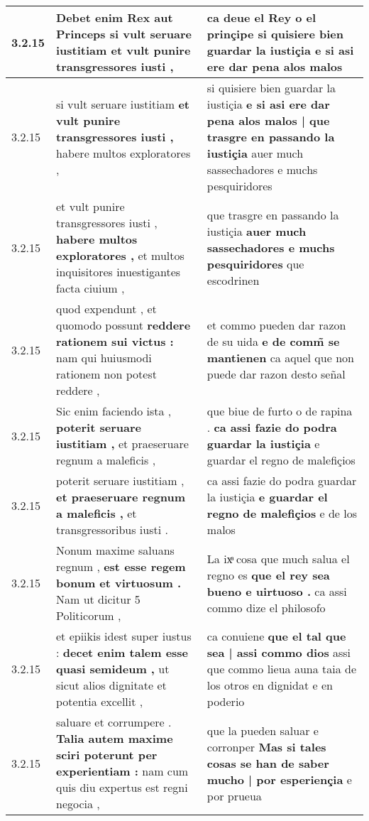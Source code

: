 \begin{tabular}{|p{1cm}|p{6.5cm}|p{6.5cm}|}
3.2.15 & Debet enim Rex aut Princeps \textbf{ si vult seruare iustitiam } et vult punire transgressores iusti , & ca deue el Rey o el prinçipe \textbf{ si quisiere bien guardar la iustiçia } e si asi ere dar pena alos malos \\\hline
3.2.15 & si vult seruare iustitiam \textbf{ et vult punire transgressores iusti , } habere multos exploratores , & si quisiere bien guardar la iustiçia \textbf{ e si asi ere dar pena alos malos | que trasgre en passando la iustiçia } auer much sassechadores e muchs pesquiridores \\\hline
3.2.15 & et vult punire transgressores iusti , \textbf{ habere multos exploratores , } et multos inquisitores inuestigantes facta ciuium , & que trasgre en passando la iustiçia \textbf{ auer much sassechadores e muchs pesquiridores } que escodrinen \\\hline
3.2.15 & quod expendunt , et quomodo possunt \textbf{ reddere rationem sui victus : } nam qui huiusmodi rationem non potest reddere , & et commo pueden dar razon de su uida \textbf{ e de comm̃ se mantienen } ca aquel que non puede dar razon desto señal \\\hline
3.2.15 & Sic enim faciendo ista , \textbf{ poterit seruare iustitiam , } et praeseruare regnum a maleficis , & que biue de furto o de rapina . \textbf{ ca assi fazie do podra guardar la iustiçia } e guardar el regno de malefiçios \\\hline
3.2.15 & poterit seruare iustitiam , \textbf{ et praeseruare regnum a maleficis , } et transgressoribus iusti . & ca assi fazie do podra guardar la iustiçia \textbf{ e guardar el regno de malefiçios } e de los malos \\\hline
3.2.15 & Nonum maxime saluans regnum , \textbf{ est esse regem bonum et virtuosum . } Nam ut dicitur 5 Politicorum , & La ixͣ cosa que much salua el regno es \textbf{ que el rey sea bueno e uirtuoso . } ca assi commo dize el philosofo \\\hline
3.2.15 & et epiikis idest super iustus : \textbf{ decet enim talem esse quasi semideum , } ut sicut alios dignitate et potentia excellit , & ca conuiene \textbf{ que el tal que sea | assi commo dios } assi que commo lieua auna taia de los otros en dignidat e en poderio \\\hline
3.2.15 & saluare et corrumpere . \textbf{ Talia autem maxime sciri poterunt per experientiam : } nam cum quis diu expertus est regni negocia , & que la pueden saluar e corronper \textbf{ Mas si tales cosas se han de saber mucho | por esperiençia } e por prueua \\\hline

\end{tabular}
